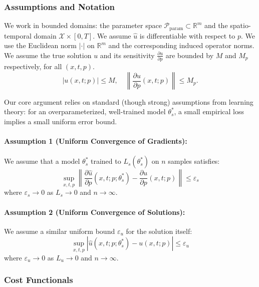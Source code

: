 \subsubsection*{Assumptions and Notation}

We work in bounded domains: the parameter space $\mathcal{P}_{\text{param}} \subset \mathbb{R}^m$ and the spatio-temporal domain $\mathcal{X} \times [0,T]$. We assume $\hat{u}$ is differentiable with respect to $p$. We use the Euclidean norm $|\cdot|$ on $\mathbb{R}^m$ and the corresponding induced operator norms. We assume the true solution $u$ and its sensitivity $\frac{\partial u}{\partial p}$ are bounded by $M$ and $M_p$ respectively, for all $(x,t,p)$.
\begin{equation}
|u(x,t;p)| \leq M, \quad \left\| \frac{\partial u}{\partial p}(x,t;p) \right\| \leq M_p.
\end{equation}

Our core argument relies on standard (though strong) assumptions from learning theory: for an overparameterized, well-trained model $\theta_s^*$, a small empirical loss implies a small uniform error bound.

\paragraph{Assumption 1 (Uniform Convergence of Gradients):}
We assume that a model $\theta_s^*$ trained to $L_s(\theta_s^*)$ on $n$ samples satisfies:
\begin{equation}
\sup_{x,t,p} \left\| \frac{\partial \hat{u}}{\partial p}(x,t;p;\theta_s^*) - \frac{\partial u}{\partial p}(x,t;p) \right\| \le \varepsilon_s
\end{equation}
where $\varepsilon_s \to 0$ as $L_s \to 0$ and $n \to \infty$.

\paragraph{Assumption 2 (Uniform Convergence of Solutions):}
We assume a similar uniform bound $\varepsilon_u$ for the solution itself:
\begin{equation}
\sup_{x,t,p} |\hat{u}(x,t;p;\theta_s^*) - u(x,t;p)| \le \varepsilon_u
\end{equation}
where $\varepsilon_u \to 0$ as $L_u \to 0$ and $n \to \infty$.

\subsubsection*{Cost Functionals}

